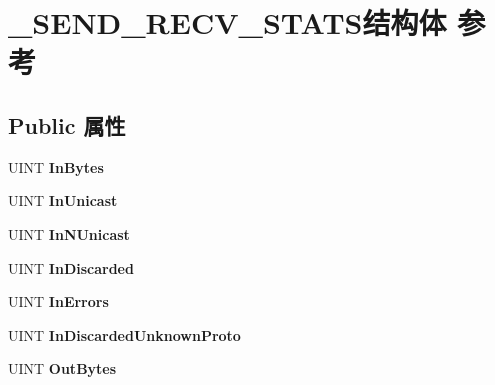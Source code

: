 \hypertarget{struct___s_e_n_d___r_e_c_v___s_t_a_t_s}{}\section{\+\_\+\+S\+E\+N\+D\+\_\+\+R\+E\+C\+V\+\_\+\+S\+T\+A\+T\+S结构体 参考}
\label{struct___s_e_n_d___r_e_c_v___s_t_a_t_s}
\subsection*{Public 属性}
\begin{DoxyCompactItemize}
\item 
\mbox{\label{struct___s_e_n_d___r_e_c_v___s_t_a_t_s_af3ca0dcd11f7f727bee2256e19165788}} 
U\+I\+NT {\bfseries In\+Bytes}
\item 
\mbox{\label{struct___s_e_n_d___r_e_c_v___s_t_a_t_s_ac5bf6b30949e80e73966dc4d06eaf681}} 
U\+I\+NT {\bfseries In\+Unicast}
\item 
\mbox{\label{struct___s_e_n_d___r_e_c_v___s_t_a_t_s_a091850f2d6203a8dd0ae4e8552508429}} 
U\+I\+NT {\bfseries In\+N\+Unicast}
\item 
\mbox{\label{struct___s_e_n_d___r_e_c_v___s_t_a_t_s_a6060a0204c8ab18e3eedb086b8e582d7}} 
U\+I\+NT {\bfseries In\+Discarded}
\item 
\mbox{\label{struct___s_e_n_d___r_e_c_v___s_t_a_t_s_accd6b28786b7ac017f0f3a4fe37f36c9}} 
U\+I\+NT {\bfseries In\+Errors}
\item 
\mbox{\label{struct___s_e_n_d___r_e_c_v___s_t_a_t_s_a5443cd1f897293c5450cf81c75101b66}} 
U\+I\+NT {\bfseries In\+Discarded\+Unknown\+Proto}
\item 
\mbox{\label{struct___s_e_n_d___r_e_c_v___s_t_a_t_s_aa67336c8139282c269f7143f8bfc0b39}} 
U\+I\+NT {\bfseries Out\+Bytes}
\item 
\mbox{\label{struct___s_e_n_d___r_e_c_v___s_t_a_t_s_a09cd27dda6782436b57ee8ce6be2823d}} 

\end{DoxyCompactItemize}

